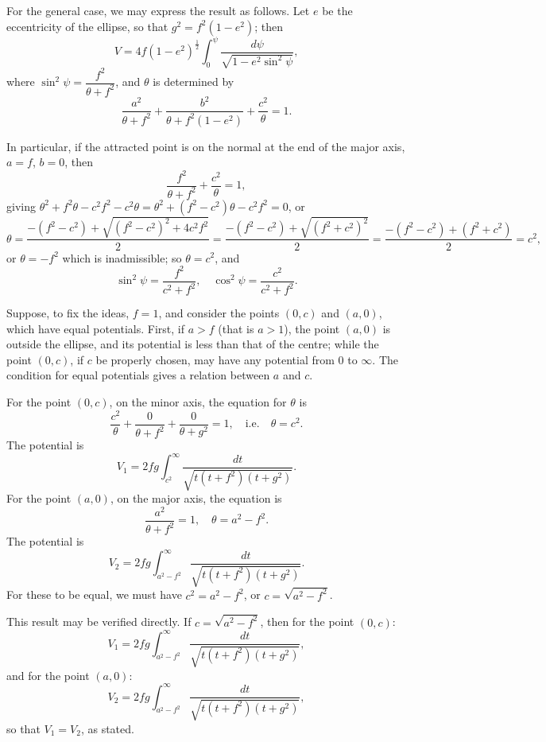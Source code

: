 \documentclass[11pt,a4paper]{book}
\begin{document}
\begin{art}
For the general case, we may express the result as follows. Let $e$ be the eccentricity of the ellipse, so that $g^2 = f^2(1-e^2)$; then
\[
V = 4f(1-e^2)^{\frac{1}{2}}\int_0^{\psi} \frac{d\psi}{\sqrt{1 - e^2\sin^2\psi}},
\]
where $\sin^2\psi = \dfrac{f^2}{\theta + f^2}$, and $\theta$ is determined by
\[
\frac{a^2}{\theta + f^2} + \frac{b^2}{\theta + f^2(1-e^2)} + \frac{c^2}{\theta} = 1.
\]
\end{art}

\begin{art}
In particular, if the attracted point is on the normal at the end of the major axis, $a=f$, $b=0$, then
\[
\frac{f^2}{\theta + f^2} + \frac{c^2}{\theta} = 1,
\]
giving $\theta^2 + f^2\theta - c^2f^2 - c^2\theta = \theta^2 + (f^2-c^2)\theta - c^2f^2 = 0$, or
\[
\theta = \frac{-(f^2-c^2) + \sqrt{(f^2-c^2)^2 + 4c^2f^2}}{2}
= \frac{-(f^2-c^2) + \sqrt{(f^2+c^2)^2}}{2}
= \frac{-(f^2-c^2) + (f^2+c^2)}{2} = c^2,
\]
or $\theta = -f^2$ which is inadmissible; so $\theta = c^2$, and
\[
\sin^2\psi = \frac{f^2}{c^2 + f^2},
\quad
\cos^2\psi = \frac{c^2}{c^2 + f^2}.
\]
\end{art}

\begin{art}
Suppose, to fix the ideas, $f=1$, and consider the points $(0, c)$ and $(a, 0)$, which have equal potentials. First, if $a > f$ (that is $a > 1$), the point $(a, 0)$ is outside the ellipse, and its potential is less than that of the centre; while the point $(0, c)$, if $c$ be properly chosen, may have any potential from $0$ to $\infty$. The condition for equal potentials gives a relation between $a$ and $c$.
\end{art}

\begin{art}
For the point $(0, c)$, on the minor axis, the equation for $\theta$ is
\[
\frac{c^2}{\theta} + \frac{0}{\theta + f^2} + \frac{0}{\theta + g^2} = 1,
\quad \text{i.e.} \quad \theta = c^2.
\]
The potential is
\[
V_1 = 2fg\int_{c^2}^{\infty} \frac{dt}{\sqrt{t(t+f^2)(t+g^2)}}.
\]
For the point $(a, 0)$, on the major axis, the equation is
\[
\frac{a^2}{\theta + f^2} = 1,
\quad \theta = a^2 - f^2.
\]
The potential is
\[
V_2 = 2fg\int_{a^2-f^2}^{\infty} \frac{dt}{\sqrt{t(t+f^2)(t+g^2)}}.
\]
For these to be equal, we must have $c^2 = a^2 - f^2$, or $c = \sqrt{a^2 - f^2}$.
\end{art}

\begin{art}
This result may be verified directly. If $c = \sqrt{a^2 - f^2}$, then for the point $(0, c)$:
\[
V_1 = 2fg\int_{a^2-f^2}^{\infty} \frac{dt}{\sqrt{t(t+f^2)(t+g^2)}},
\]
and for the point $(a, 0)$:
\[
V_2 = 2fg\int_{a^2-f^2}^{\infty} \frac{dt}{\sqrt{t(t+f^2)(t+g^2)}},
\]
so that $V_1 = V_2$, as stated.
\end{art}
\end{document}
